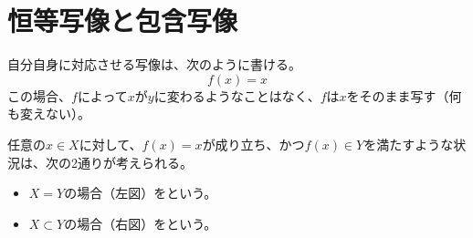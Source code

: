 \documentclass[../../../topic_linear-algebra]{subfiles}
\begin{document}
\sectionline
\section{恒等写像と包含写像}

自分自身に対応させる写像は、次のように書ける。
\begin{equation*}
  f(x) = x
\end{equation*}
この場合、$f$によって$x$が$y$に変わるようなことはなく、$f$は$x$をそのまま写す（何も変えない）。

\br

任意の$x \in X$に対して、$f(x) = x$が成り立ち、かつ$f(x) \in Y$を満たすような状況は、次の2通りが考えられる。
\begin{itemize}
  \item $X = Y$の場合（左図）をという。
  \item $X \subset Y$の場合（右図）をという。
\end{itemize}
\end{document}
